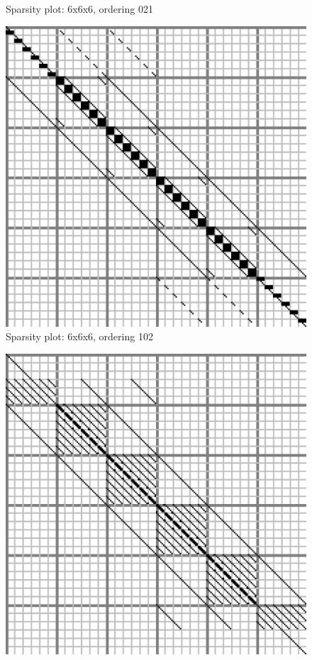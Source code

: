 \documentclass[10pt]{article}
\begin{document}
\begin{multicols}{2}
\begin{center}
\begin{minipage}[t]{.5\textwidth}
\begin{figure}[H]
    \caption{Sparsity plot: 6x6x6, ordering 021 }
\end{figure}
\vspace{\spmgin}
\begin{figure}[H]
    \centering
    \includegraphics[width=\spwidth]{../img/sparsity/int_small_6x6x6_102.eps}
    \caption{Sparsity plot: 6x6x6, ordering 102 }
\end{figure}
\end{minipage}%
\begin{minipage}[t]{.5\textwidth}%
\begin{figure}[H]
    \centering
    \includegraphics[width=\spwidth]{../img/sparsity/int_small_6x6x6_120.eps}

\end{figure}
\end{minipage}
\end{center}
\end{multicols}
\end{document}
